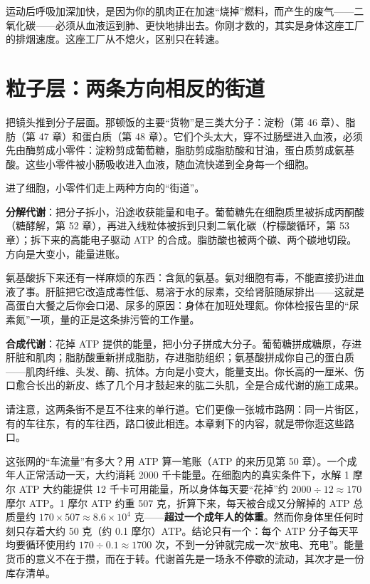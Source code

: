 运动后呼吸加深加快，是因为你的肌肉正在加速“烧掉”燃料，而产生的废气——二氧化碳——必须从血液运到肺、更快地排出去。你刚才数的，其实是身体这座工厂的排烟速度。这座工厂从不熄火，区别只在转速。

\section{粒子层：两条方向相反的街道}

把镜头推到分子层面。那顿饭的主要“货物”是三类大分子：淀粉（第 46 章）、脂肪（第 47 章）和蛋白质（第 48 章）。它们个头太大，穿不过肠壁进入血液，必须先由酶剪成小零件：淀粉剪成葡萄糖，脂肪剪成脂肪酸和甘油，蛋白质剪成氨基酸。这些小零件被小肠吸收进入血液，随血流快递到全身每一个细胞。

进了细胞，小零件们走上两种方向的“街道”。

\textbf{分解代谢}：把分子拆小，沿途收获能量和电子。葡萄糖先在细胞质里被拆成丙酮酸（糖酵解，第 52 章），再进入线粒体被拆到只剩二氧化碳（柠檬酸循环，第 53 章）；拆下来的高能电子驱动 ATP 的合成。脂肪酸也被两个碳、两个碳地切段。方向是大变小，能量进账。

氨基酸拆下来还有一样麻烦的东西：含氮的氨基。氨对细胞有毒，不能直接扔进血液了事。肝脏把它改造成毒性低、易溶于水的尿素，交给肾脏随尿排出——这就是高蛋白大餐之后你会口渴、尿多的原因：身体在加班处理氮。你体检报告里的“尿素氮”一项，量的正是这条排污管的工作量。

\textbf{合成代谢}：花掉 ATP 提供的能量，把小分子拼成大分子。葡萄糖拼成糖原，存进肝脏和肌肉；脂肪酸重新拼成脂肪，存进脂肪组织；氨基酸拼成你自己的蛋白质——肌肉纤维、头发、酶、抗体。方向是小变大，能量支出。你长高的一厘米、伤口愈合长出的新皮、练了几个月才鼓起来的肱二头肌，全是合成代谢的施工成果。

请注意，这两条街不是互不往来的单行道。它们更像一张城市路网：同一片街区，有的车往东，有的车往西，路口彼此相连。本章剩下的内容，就是带你逛这些路口。

\begin{qiaoliang}
这张网的“车流量”有多大？用 ATP 算一笔账（ATP 的来历见第 50 章）。一个成年人正常活动一天，大约消耗 2000 千卡能量。在细胞内的真实条件下，水解 1 摩尔 ATP 大约能提供 12 千卡可用能量，所以身体每天要“花掉”约 $2000 \div 12 \approx 170$ 摩尔 ATP。1 摩尔 ATP 约重 507 克，折算下来，每天被合成又分解掉的 ATP 总质量约 $170 \times 507 \approx 8.6 \times 10^{4}$ 克——\textbf{超过一个成年人的体重}。然而你身体里任何时刻只存着大约 50 克（约 0.1 摩尔）ATP。结论只有一个：每个 ATP 分子每天平均要循环使用约 $170 \div 0.1 \approx 1700$ 次，不到一分钟就完成一次“放电、充电”。能量货币的意义不在于攒，而在于转。代谢首先是一场永不停歇的流动，其次才是一份库存清单。
\end{qiaoliang}

